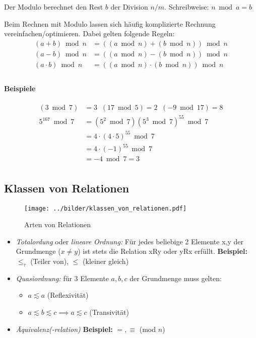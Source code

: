 Der Modulo berechnet den Rest $b$ der Division $n/m$. Schreibweise: $n \bmod a = b$

Beim Rechnen mit Modulo lassen sich häufig komplizierte Rechnung
vereinfachen/optimieren. Dabei gelten folgende Regeln:
\begin{align*}
  (a+b) \bmod n       &= ((a \bmod n) + (b \bmod n)) \bmod n \\
  (a-b) \bmod n       &= ((a \bmod n) - (b \bmod n)) \bmod n \\
  (a \cdot b) \bmod n &= ((a \bmod n) \cdot (b \bmod n)) \bmod n \\
\end{align*}

\paragraph{Beispiele}
\begin{align*}
  (3 \bmod 7)&= 3   \;\;   (17 \bmod 5)= 2   \;\;    (-9 \bmod 17)= 8 \\
  5^{167} \bmod 7 &= (5^2 \bmod 7) (5^3 \bmod 7)^{55} \bmod 7 \\
                 &= 4 \cdot (4 \cdot 5)^{55} \bmod 7 \\
                 &= 4 \cdot (-1)^{55} \bmod 7\\
                 &= -4 \bmod 7 = 3\\
\end{align*}

\subsection{Klassen von Relationen}

\begin{figure}[h]
  \texttt{[image: ../bilder/klassen\_von\_relationen.pdf]}
  \caption{Arten von Relationen}
\end{figure}

\begin{itemize}
\item \emph{Totalordung} oder \emph{lineare Ordnung:} Für jedes
  beliebige 2 Elemente x,y der Grundmenge ($x \ne y$) ist stets die
  Relation xRy oder yRx erfüllt. \textbf{Beispiel:} $\le_\tau$ (Teiler
  von), $\le$ (kleiner gleich)
\item \emph{Quasiordnung:} für 3 Elemente $a,b,c$ der Grundmenge muss gelten:
  \begin{itemize}
  \item $a\lesssim a$ (Reflexivität)
  \item $a\lesssim b\lesssim c \implies a \lesssim c$ (Transivität)
  \end{itemize}
\item \emph{Äquivalenz(-relation)}  \textbf{Beispiel:} $=, \equiv$ (mod $n$)
\end{itemize}

